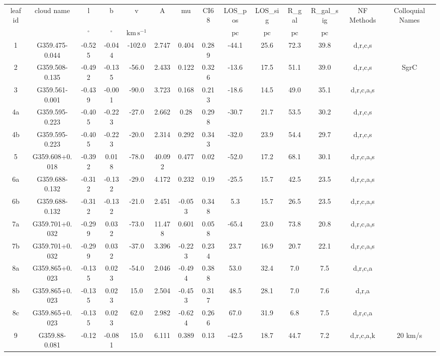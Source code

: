 \begin{table}
\begin{tabular}{cccccccccccccc}
leaf id & cloud name & l & b & v & A & mu & CI68 & LOS_pos & LOS_sig & R_gal & R_gal_sig & NF Methods & Colloquial Names \\
 &  & $\mathrm{{}^{\circ}}$ & $\mathrm{{}^{\circ}}$ & $\mathrm{km\,s^{-1}}$ &  &  &  & $\mathrm{pc}$ & $\mathrm{pc}$ & $\mathrm{pc}$ & $\mathrm{pc}$ &  &  \\
1 & G359.475-0.044 & -0.525 & -0.044 & -102.0 & 2.747 & 0.404 & 0.289 & -44.1 & 25.6 & 72.3 & 39.8 & d,r,c,s &  \\
2 & G359.508-0.135 & -0.492 & -0.135 & -56.0 & 2.433 & 0.122 & 0.326 & -13.6 & 17.5 & 51.1 & 39.0 & d,r,c,s & SgrC \\
3 & G359.561-0.001 & -0.439 & -0.001 & -90.0 & 3.723 & 0.168 & 0.213 & -18.6 & 14.5 & 49.0 & 35.1 & d,r,c,a,s &  \\
4a & G359.595-0.223 & -0.405 & -0.223 & -27.0 & 2.662 & 0.28 & 0.298 & -30.7 & 21.7 & 53.5 & 30.2 & d,r,c,s &  \\
4b & G359.595-0.223 & -0.405 & -0.223 & -20.0 & 2.314 & 0.292 & 0.343 & -32.0 & 23.9 & 54.4 & 29.7 & d,r,c,s &  \\
5 & G359.608+0.018 & -0.392 & 0.018 & -78.0 & 40.092 & 0.477 & 0.02 & -52.0 & 17.2 & 68.1 & 30.1 & d,r,c,a,s &  \\
6a & G359.688-0.132 & -0.312 & -0.132 & -29.0 & 4.172 & 0.232 & 0.19 & -25.5 & 15.7 & 42.5 & 23.5 & d,r,c,a,s &  \\
6b & G359.688-0.132 & -0.312 & -0.132 & -21.0 & 2.451 & -0.053 & 0.348 & 5.3 & 15.7 & 26.5 & 23.5 & d,r,c,a,s &  \\
7a & G359.701+0.032 & -0.299 & 0.032 & -73.0 & 11.478 & 0.601 & 0.058 & -65.4 & 23.0 & 73.8 & 20.8 & d,r,c,a,s &  \\
7b & G359.701+0.032 & -0.299 & 0.032 & -37.0 & 3.396 & -0.223 & 0.234 & 23.7 & 16.9 & 20.7 & 22.1 & d,r,c,a,s &  \\
8a & G359.865+0.023 & -0.135 & 0.023 & -54.0 & 2.046 & -0.494 & 0.388 & 53.0 & 32.4 & 7.0 & 7.5 & d,r,c,a &  \\
8b & G359.865+0.023 & -0.135 & 0.023 & 15.0 & 2.504 & -0.453 & 0.317 & 48.5 & 28.1 & 7.0 & 7.6 & d,r,a &  \\
8c & G359.865+0.023 & -0.135 & 0.023 & 62.0 & 2.982 & -0.624 & 0.266 & 67.0 & 31.9 & 6.8 & 7.5 & d,r,c,a &  \\
9 & G359.88-0.081 & -0.12 & -0.081 & 15.0 & 6.111 & 0.389 & 0.13 & -42.5 & 18.7 & 44.7 & 7.2 & d,r,c,a,k & 20 km/s \\

\end{tabular}
\end{table}

